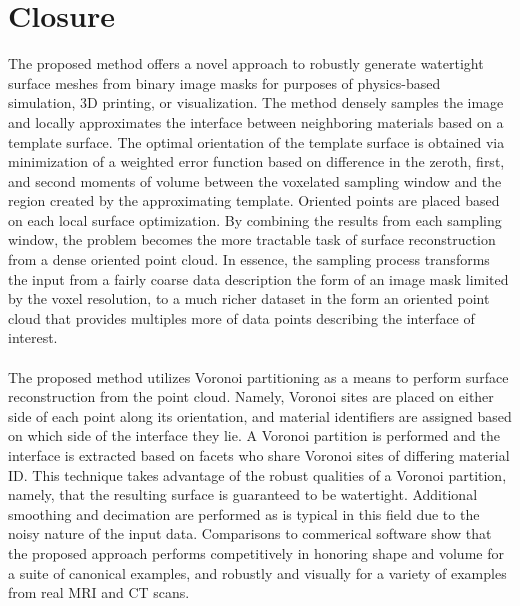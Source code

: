 \section{Closure}

The proposed method offers a novel approach to robustly generate watertight surface meshes from binary image masks for purposes of physics-based simulation, 3D printing, or visualization. The method densely samples the image and locally approximates the interface between neighboring materials based on a template surface. The optimal orientation of the template surface is obtained via minimization of a weighted error function based on difference in the zeroth, first, and second moments of volume between the voxelated sampling window and the region created by the approximating template. Oriented points are placed based on each local surface optimization. By combining the results from each sampling window, the problem becomes the more tractable task of surface reconstruction from a dense oriented point cloud. In essence, the sampling process transforms the input from a fairly coarse data description the form of an image mask limited by the voxel resolution, to a much richer dataset in the form an oriented point cloud that provides multiples more of data points describing the interface of interest. \\ \\
%
The proposed method utilizes Voronoi partitioning as a means to perform surface reconstruction from the point cloud. Namely, Voronoi sites are placed on either side of each point along its orientation, and material identifiers are assigned based on which side of the interface they lie. A Voronoi partition is performed and the interface is extracted based on facets who share Voronoi sites of differing material ID. This technique takes advantage of the robust qualities of a Voronoi partition, namely, that the resulting surface is guaranteed to be watertight. Additional smoothing and decimation are performed as is typical in this field due to the noisy nature of the input data. Comparisons to commerical software show that the proposed approach performs competitively in honoring shape and volume for a suite of canonical examples, and robustly and visually for a variety of examples from real MRI and CT scans. \\ \\
%
